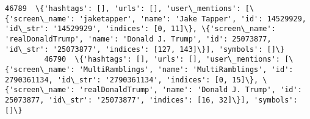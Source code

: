 \documentclass[11pt]{article}
\begin{document}
\begin{Verbatim}[commandchars=\\\{\}]
         46789  \{'hashtags': [], 'urls': [], 'user\_mentions': [\{'screen\_name': 'jaketapper', 'name': 'Jake Tapper', 'id': 14529929, 'id\_str': '14529929', 'indices': [0, 11]\}, \{'screen\_name': 'realDonaldTrump', 'name': 'Donald J. Trump', 'id': 25073877, 'id\_str': '25073877', 'indices': [127, 143]\}], 'symbols': []\}                                                                                                                                                                                                                                                                                                                                                                                                                                                                                                                                                                                                                                                                                                                                                                                                                                                                                                     
         46790  \{'hashtags': [], 'urls': [], 'user\_mentions': [\{'screen\_name': 'MultiRamblings', 'name': 'MultiRamblings', 'id': 2790361134, 'id\_str': '2790361134', 'indices': [0, 15]\}, \{'screen\_name': 'realDonaldTrump', 'name': 'Donald J. Trump', 'id': 25073877, 'id\_str': '25073877', 'indices': [16, 32]\}], 'symbols': []\}                                                                                                                                                                                                                                                                                                                                                                                                                                                                                                                                                                                                                                                                                                                                                                                                                                                                                            

\end{Verbatim}
\end{document}
